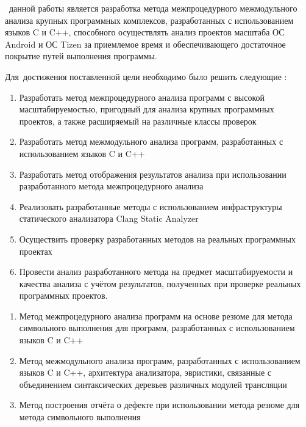  \aim\ данной работы является разработка метода межпроцедурного межмодульного анализа крупных программных комплексов, разработанных с использованием языков C и C++, способного осуществлять анализ проектов масштаба ОС Android и ОС Tizen за приемлемое время и обеспечивающего достаточное покрытие путей выполнения программы.

Для~достижения поставленной цели необходимо было решить следующие {\tasks}:
\begin{enumerate}
  \item Разработать метод межпроцедурного анализа программ с высокой масштабируемостью, пригодный для анализа крупных программных проектов, а также расширяемый на различные классы проверок
  \item Разработать метод межмодульного анализа программ, разработанных с использованием языков C и C++
  \item Разработать метод отображения результатов анализа при использовании разработанного метода межпроцедурного анализа
  \item Реализовать разработанные методы с использованием инфраструктуры статического анализатора Clang Static Analyzer
  \item Осуществить проверку разработанных методов на реальных программных проектах
  \item Провести анализ разработанного метода на предмет масштабируемости и качества анализа с учётом результатов, полученных при проверке реальных программных проектов.
\end{enumerate}

\begin{enumerate}
  \item Метод межпроцедурного анализа программ на основе резюме для метода символьного выполнения для программ, разработанных с использованием языков C и C++
  \item Метод межмодульного анализа программ, разработанных с использованием языков C и C++, архитектура анализатора, эвристики, связанные с объединением синтаксических деревьев различных модулей трансляции
  \item Метод построения отчёта о дефекте при использовании метода резюме для метода символьного выполнения
\end{enumerate}

